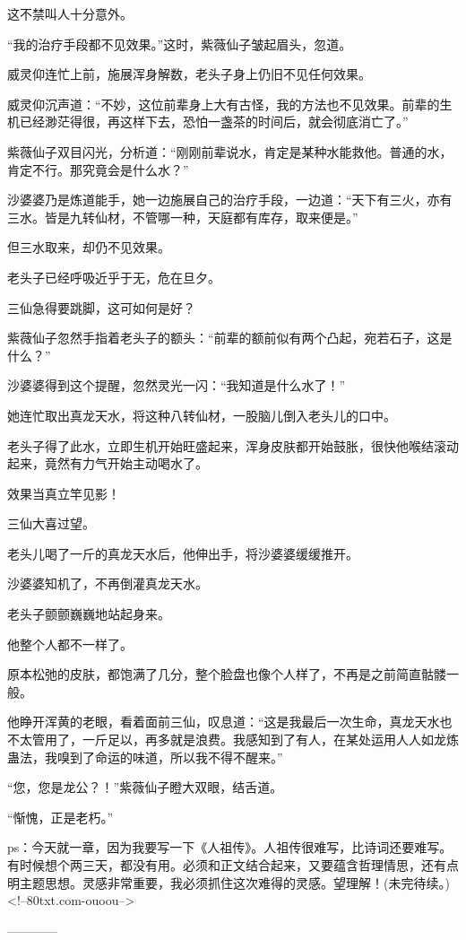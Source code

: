 \begin{this_body}
这不禁叫人十分意外。

“我的治疗手段都不见效果。”这时，紫薇仙子皱起眉头，忽道。

威灵仰连忙上前，施展浑身解数，老头子身上仍旧不见任何效果。

威灵仰沉声道：“不妙，这位前辈身上大有古怪，我的方法也不见效果。前辈的生机已经渺茫得很，再这样下去，恐怕一盏茶的时间后，就会彻底消亡了。”

紫薇仙子双目闪光，分析道：“刚刚前辈说水，肯定是某种水能救他。普通的水，肯定不行。那究竟会是什么水？”

沙婆婆乃是炼道能手，她一边施展自己的治疗手段，一边道：“天下有三火，亦有三水。皆是九转仙材，不管哪一种，天庭都有库存，取来便是。”

但三水取来，却仍不见效果。

老头子已经呼吸近乎于无，危在旦夕。

三仙急得要跳脚，这可如何是好？

紫薇仙子忽然手指着老头子的额头：“前辈的额前似有两个凸起，宛若石子，这是什么？”

沙婆婆得到这个提醒，忽然灵光一闪：“我知道是什么水了！”

她连忙取出真龙天水，将这种八转仙材，一股脑儿倒入老头儿的口中。

老头子得了此水，立即生机开始旺盛起来，浑身皮肤都开始鼓胀，很快他喉结滚动起来，竟然有力气开始主动喝水了。

效果当真立竿见影！

三仙大喜过望。

老头儿喝了一斤的真龙天水后，他伸出手，将沙婆婆缓缓推开。

沙婆婆知机了，不再倒灌真龙天水。

老头子颤颤巍巍地站起身来。

他整个人都不一样了。

原本松弛的皮肤，都饱满了几分，整个脸盘也像个人样了，不再是之前简直骷髅一般。

他睁开浑黄的老眼，看着面前三仙，叹息道：“这是我最后一次生命，真龙天水也不太管用了，一斤足以，再多就是浪费。我感知到了有人，在某处运用人人如龙炼蛊法，我嗅到了命运的味道，所以我不得不醒来。”

“您，您是龙公？！”紫薇仙子瞪大双眼，结舌道。

“惭愧，正是老朽。”

ps：今天就一章，因为我要写一下《人祖传》。人祖传很难写，比诗词还要难写。有时候想个两三天，都没有用。必须和正文结合起来，又要蕴含哲理情思，还有点明主题思想。灵感非常重要，我必须抓住这次难得的灵感。望理解！(未完待续。)<!--80txt.com-ouoou-->

------------

\end{this_body}

